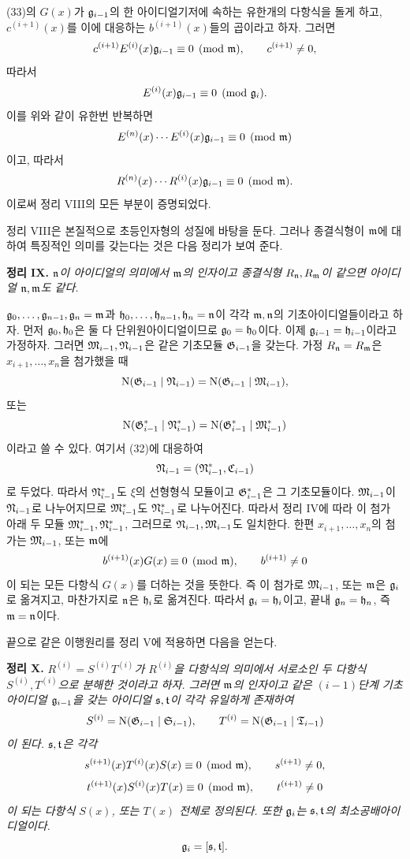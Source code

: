 (33)의 \(G(x)\)가 \(\mathfrak g_{i-1}\)의 한 아이디얼기저에 속하는 유한개의 다항식을 돌게 하고, \(c^{(i+1)}(x)\)를 이에 대응하는 \(b^{(i+1)}(x)\)들의 곱이라고 하자. 그러면
\[
c^{(i+1)}E^{(i)}(x)\mathfrak g_{i-1}\equiv0\pmod{\mathfrak m},
\qquad c^{(i+1)}\ne0,
\]
따라서
\[
E^{(i)}(x)\mathfrak g_{i-1}\equiv0\pmod{\mathfrak g_i}.
\]
이를 위와 같이 유한번 반복하면
\[
E^{(n)}(x)\cdots E^{(i)}(x)\mathfrak g_{i-1}\equiv0\pmod{\mathfrak m}
\]
이고, 따라서
\[
R^{(n)}(x)\cdots R^{(i)}(x)\mathfrak g_{i-1}\equiv0\pmod{\mathfrak m}.
\]
이로써 정리 VIII의 모든 부분이 증명되었다.

정리 VIII은 본질적으로 초등인자형의 성질에 바탕을 둔다. 그러나 종결식형이 \(\mathfrak m\)에 대하여 특징적인 의미를 갖는다는 것은 다음 정리가 보여 준다.

\medskip
\noindent\textbf{정리 IX.} \emph{\(\mathfrak n\)이 아이디얼의 의미에서 \(\mathfrak m\)의 인자이고 종결식형 \(R_\mathfrak n,R_\mathfrak m\)이 같으면 아이디얼 \(\mathfrak n,\mathfrak m\)도 같다.}

\(\mathfrak g_0,\ldots,\mathfrak g_{n-1},\mathfrak g_n=\mathfrak m\)과 \(\mathfrak h_0,\ldots,\mathfrak h_{n-1},\mathfrak h_n=\mathfrak n\)이 각각 \(\mathfrak m,\mathfrak n\)의 기초아이디얼들이라고 하자. 먼저 \(\mathfrak g_0,\mathfrak h_0\)은 둘 다 단위원아이디얼이므로 \(\mathfrak g_0=\mathfrak h_0\)이다. 이제 \(\mathfrak g_{i-1}=\mathfrak h_{i-1}\)이라고 가정하자. 그러면 \(\mathfrak M_{i-1},\mathfrak N_{i-1}\)은 같은 기초모듈 \(\mathfrak G_{i-1}\)을 갖는다. 가정 \(R_\mathfrak n=R_\mathfrak m\)은 \(x_{i+1},\ldots,x_n\)을 첨가했을 때
\[
\operatorname N(\mathfrak G_{i-1}\mid\mathfrak N_{i-1})
=\operatorname N(\mathfrak G_{i-1}\mid\mathfrak M_{i-1}),
\]
또는
\[
\operatorname N(\mathfrak G^*_{i-1}\mid\mathfrak N^*_{i-1})
=\operatorname N(\mathfrak G^*_{i-1}\mid\mathfrak M^*_{i-1})
\]
이라고 쓸 수 있다. 여기서 (32)에 대응하여
\[
\mathfrak N_{i-1}=(\mathfrak N^*_{i-1},\mathfrak C_{i-1})
\]
로 두었다. 따라서 \(\mathfrak N^*_{i-1}\)도 \(\xi\)의 선형형식 모듈이고 \(\mathfrak G^*_{i-1}\)은 그 기초모듈이다. \(\mathfrak M_{i-1}\)이 \(\mathfrak N_{i-1}\)로 나누어지므로 \(\mathfrak M^*_{i-1}\)도 \(\mathfrak N^*_{i-1}\)로 나누어진다. 따라서 정리 IV에 따라 이 첨가 아래 두 모듈 \(\mathfrak M^*_{i-1},\mathfrak N^*_{i-1}\), 그러므로 \(\mathfrak N_{i-1},\mathfrak M_{i-1}\)도 일치한다. 한편 \(x_{i+1},\ldots,x_n\)의 첨가는 \(\mathfrak M_{i-1}\), 또는 \(\mathfrak m\)에
\[
b^{(i+1)}(x)G(x)\equiv0\pmod{\mathfrak m},\qquad b^{(i+1)}\ne0
\]
이 되는 모든 다항식 \(G(x)\)를 더하는 것을 뜻한다. 즉 이 첨가로 \(\mathfrak M_{i-1}\), 또는 \(\mathfrak m\)은 \(\mathfrak g_i\)로 옮겨지고, 마찬가지로 \(\mathfrak n\)은 \(\mathfrak h_i\)로 옮겨진다. 따라서 \(\mathfrak g_i=\mathfrak h_i\)이고, 끝내 \(\mathfrak g_n=\mathfrak h_n\), 즉 \(\mathfrak m=\mathfrak n\)이다.

끝으로 같은 이행원리를 정리 V에 적용하면 다음을 얻는다.

\medskip
\noindent\textbf{정리 X.} \emph{\(R^{(i)}=S^{(i)}T^{(i)}\)가 \(R^{(i)}\)을 다항식의 의미에서 서로소인 두 다항식 \(S^{(i)},T^{(i)}\)으로 분해한 것이라고 하자. 그러면 \(\mathfrak m\)의 인자이고 같은 \((i-1)\)단계 기초아이디얼 \(\mathfrak g_{i-1}\)을 갖는 아이디얼 \(\mathfrak s,\mathfrak t\)이 각각 유일하게 존재하여
\[
S^{(i)}=\operatorname N(\mathfrak G_{i-1}\mid\mathfrak S_{i-1}),\qquad
T^{(i)}=\operatorname N(\mathfrak G_{i-1}\mid\mathfrak T_{i-1})
\]
이 된다. \(\mathfrak s,\mathfrak t\)은 각각
\[
s^{(i+1)}(x)T^{(i)}(x)S(x)\equiv0\pmod{\mathfrak m},
\qquad s^{(i+1)}\ne0,
\]
\[
t^{(i+1)}(x)S^{(i)}(x)T(x)\equiv0\pmod{\mathfrak m},
\qquad t^{(i+1)}\ne0
\]
이 되는 다항식 \(S(x)\), 또는 \(T(x)\) 전체로 정의된다. 또한 \(\mathfrak g_i\)는 \(\mathfrak s,\mathfrak t\)의 최소공배아이디얼이다.
\[
\mathfrak g_i=[\mathfrak s,\mathfrak t].
\]}

